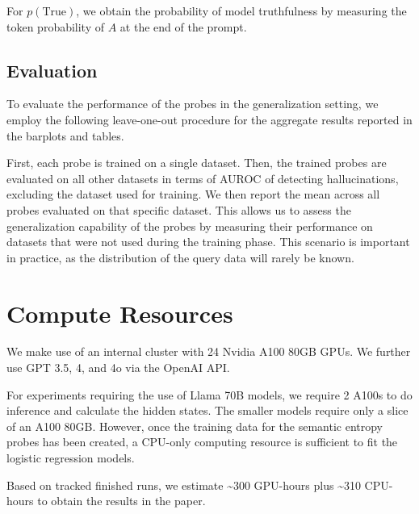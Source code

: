 \documentclass{article}
\begin{document}
For $p(\text{True})$, we obtain the probability of model truthfulness by measuring the token probability of $A$ at the end of the prompt.

\subsection{Evaluation}
To evaluate the performance of the probes in the generalization setting, we employ the following leave-one-out procedure for the aggregate results reported in the barplots and tables.

First, each probe is trained on a single dataset. 
Then, the trained probes are evaluated on all other datasets in terms of AUROC of detecting hallucinations, excluding the dataset used for training.
We then report the mean across all probes evaluated on that specific dataset.
This allows us to assess the generalization capability of the probes by measuring their performance on datasets that were not used during the training phase. 
This scenario is important in practice, as the distribution of the query data will rarely be known.



\section{Compute Resources}
We make use of an internal cluster with 24 Nvidia A100 80GB GPUs. We further use GPT 3.5, 4, and 4o via the OpenAI API.

For experiments requiring the use of Llama 70B models, we require 2 A100s to do inference and calculate the hidden states. The smaller models require only a slice of an A100 80GB. However, once the training data for the semantic entropy probes has been created, a CPU-only computing resource is sufficient to fit the logistic regression models.

Based on tracked finished runs, we estimate \textasciitilde300 GPU-hours plus \textasciitilde310 CPU-hours to obtain the results in the paper. %
\end{document}
